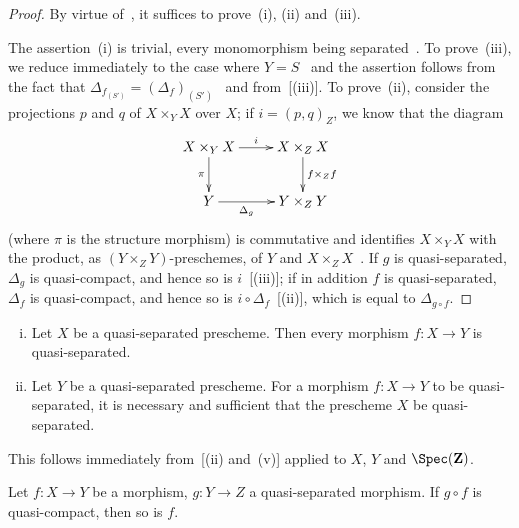 \begin{proof}
By virtue of~, it suffices to prove~(i), (ii) and~(iii).

The assertion~(i) is trivial, every monomorphism being separated~. To
prove~(iii), we reduce immediately to the case where $Y=S$~ and the assertion follows
from the fact that $\Delta_{f_{(S')}}=(\Delta_f)_{(S')}$~ and from~[(iii)]. To prove~(ii), consider
the projections $p$ and $q$ of $X\times_Y X$ over $X$; if $i=(p,q)_Z$, we know that the diagram
\[
\xymatrix{
  X\times_Y X \ar[r]^-{i} \ar[d]_-{\pi} & X\times_Z X \ar[d]^-{f\times_Z f} \\
  Y \ar[r]_-{\Delta_g} & Y\times_Z Y
}
\]
(where $\pi$ is the structure morphism) is commutative and identifies $X\times_Y X$ with the product,
as $(Y\times_Z Y)$-preschemes, of $Y$ and $X\times_Z X$~. If $g$ is
quasi-separated, $\Delta_g$ is quasi-compact, and hence so is $i$~[(iii)];
if in addition $f$ is quasi-separated, $\Delta_f$ is quasi-compact, and hence so is
$i\circ\Delta_f$~[(ii)], which is equal to $\Delta_{g\circ f}$.
\end{proof}

\begin{corollary}[1.2.3]
\label{IV.1.2.3}
\medskip\noindent
\begin{enumerate}[(i)]
  \item Let $X$ be a quasi-separated prescheme. Then every morphism $f:X\to Y$
    is quasi-separated.
  \item Let $Y$ be a quasi-separated prescheme. For a morphism $f:X\to Y$ to be quasi-separated,
    it is necessary and sufficient that the prescheme $X$ be quasi-separated.
\end{enumerate}
\end{corollary}

This follows immediately from~[(ii) and~(v)] applied to $X$, $Y$ and $\Spec(\mathbf{Z})$.

\begin{proposition}[1.2.4]
\label{IV.1.2.4}
Let $f:X\to Y$ be a morphism, $g:Y\to Z$ a quasi-separated morphism.
If $g\circ f$ is quasi-compact, then so is $f$.
\end{proposition}

